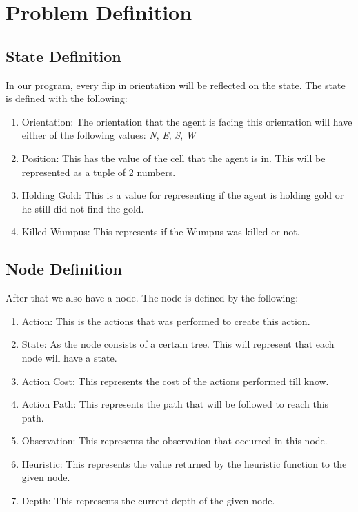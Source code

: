 
\label{chap:assign1}

\section{Problem Definition}
	
	\subsection{State Definition}
	
		In our program, every flip in orientation will be reflected on the state. The state is defined with the following:
		
\begin{enumerate}
			\item {Orientation: The orientation that the agent is facing this orientation will have either of the following values: \textit{N}, \textit{E}, \textit{S}, \textit{W}}
			\item {Position: This has the value of the cell that the agent is in. This will be represented as a tuple of 2 numbers.}
			\item{Holding Gold: This is a value for representing if the agent is holding gold or he still did not find the gold.}
			\item{Killed Wumpus: This represents if the Wumpus was killed or not.}
		\end{enumerate}

\subsection{Node Definition}
		After that we also have a node. The node is defined by the following: 
		\begin{enumerate}
			\item{Action: This is the actions that was performed to create this action.}			
			\item {State: As the node consists of a certain tree. This will represent that each node will have a state.}
			\item {Action Cost: This represents the cost of the actions performed till know.}
			\item{Action Path: This represents the path that will be followed to reach this path.}
			\item{Observation: This represents the observation that occurred in this node.}
			\item{Heuristic: This represents the value returned by the heuristic function to the given node.}	
			\item{Depth: This represents the current depth of the given node.}					
		\end{enumerate}
		
